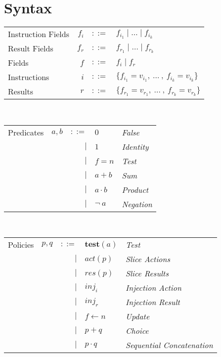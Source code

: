 \documentclass[12pt, letterpaper]{article}
\begin{document}
\section{Syntax}

  \begin{tabular}{l r c l}
    Instruction Fields   & $f_{i}$   & $::=$     & $f_{i_{1}} \mid \dots \mid f_{i_{k}}$\\
    Result Fields        & $f_{r}$   & $::=$     & $f_{r_{1}} \mid \dots \mid f_{r_{k}}$\\
    Fields               & $f$       & $::=$     & $f_i \mid f_r$ \\
    Instructions         & $i$       & $::=$     & $\{f_{i_{1}} = v_{i_{1}} ,\ \dots\ ,\ f_{i_{k}} = v_{i_{k}}\}$\\
    Results              & $r$       & $::=$     & $\{f_{r_{1}} = v_{r_{1}} ,\ \dots\ ,\ f_{r_{k}} = v_{r_{k}}\}$\\
  \end{tabular}\\

  \begin{tabular}{l c r l l}
    Predicates  & $a,b$     & $::=$  & $0$          & \textit{False} \\
                &           & $\mid$ & $1$          & \textit{Identity}    \\
                &           & $\mid$ & $f=n$        & \textit{Test} \\  
                &           & $\mid$ & $a + b$      & \textit{Sum}      \\
                &           & $\mid$ & $a \cdot b$  & \textit{Product}  \\
                &           & $\mid$ & $\neg \ a$   & \textit{Negation}
  \end{tabular}\\

  \begin{tabular}{l c r l l}
    Policies  & $p,q$ & $::=$  & $\mathbf{test}(a)$ & \textit{Test}     \\
              &       & $\mid$ & $act(p)$           & \textit{Slice Actions}    \\
              &       & $\mid$ & $res(p)$           & \textit{Slice Results}    \\
              &       & $\mid$ & $inj_{i}$          & \textit{Injection Action} \\
              &       & $\mid$ & $inj_{r}$          & \textit{Injection Result} \\
              &       & $\mid$ & $f \leftarrow n$   & \textit{Update}   \\
              &       & $\mid$ & $p + q$            & \textit{Choice}   \\
              &       & $\mid$ & $p \cdot q$        & \textit{Sequential Concatenation} \\
  \end{tabular}\\
\end{document}
